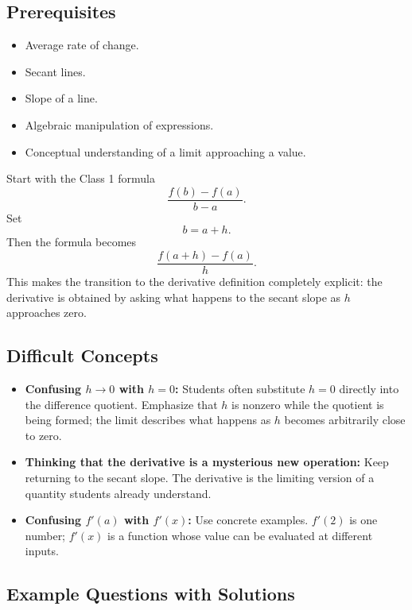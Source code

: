 \documentclass{article}
\begin{document}
\subsection*{Prerequisites}

\begin{itemize}
    \item Average rate of change.
    \item Secant lines.
    \item Slope of a line.
    \item Algebraic manipulation of expressions.
    \item Conceptual understanding of a limit approaching a value.
\end{itemize}

\begin{tcolorbox}[title=Connecting to Prior Learning]
Start with the Class 1 formula
\[
\frac{f(b)-f(a)}{b-a}.
\]
Set
\[
b=a+h.
\]
Then the formula becomes
\[
\frac{f(a+h)-f(a)}{h}.
\]
This makes the transition to the derivative definition completely explicit: the derivative is obtained by asking what happens to the secant slope as $h$ approaches zero.
\end{tcolorbox}

\subsection*{Difficult Concepts}

\begin{itemize}
    \item \textbf{Confusing $h\to0$ with $h=0$:} Students often substitute $h=0$ directly into the difference quotient. Emphasize that $h$ is nonzero while the quotient is being formed; the limit describes what happens as $h$ becomes arbitrarily close to zero.
    
    \item \textbf{Thinking that the derivative is a mysterious new operation:} Keep returning to the secant slope. The derivative is the limiting version of a quantity students already understand.
    
    \item \textbf{Confusing $f'(a)$ with $f'(x)$:} Use concrete examples. $f'(2)$ is one number; $f'(x)$ is a function whose value can be evaluated at different inputs.
\end{itemize}

\subsection*{Example Questions with Solutions}
\end{document}
